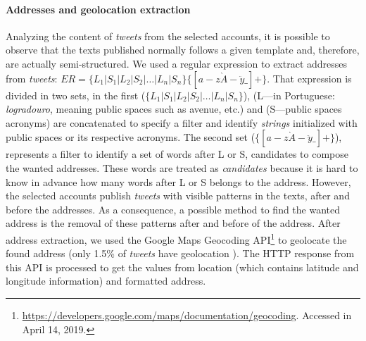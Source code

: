 \documentclass[runningheads]{llncs}
\begin{document}

%

\paragraph{\textbf{Addresses and geolocation extraction}}

Analyzing the content of \textit{tweets} from the selected accounts, it is possible to observe that the texts published normally follows a given template and, therefore, are actually semi-structured. We used a regular expression to extract addresses from \textit{tweets}: $ER = \lbrace L_1 | S_1 | L_2 | S_2 | \dots | L_n | S_n \rbrace \lbrace [a-z\grave{A}-\ddot{y}\_] + \rbrace$.
That expression is divided in two sets, in the first ($\lbrace L_1 | S_1 | L_2 | S_2 | \dots | L_n | S_n \rbrace $), (L---in Portuguese: \textit{logradouro}, meaning public spaces such as avenue, etc.) and (S---public spaces acronyms) are concatenated to specify a filter and identify \textit{strings} initialized with public spaces or its respective acronyms. The second set ($\lbrace [a-z\grave{A}-\ddot{y}\_] + \rbrace $), represents a filter to identify a set of words after L or S, candidates to compose the wanted addresses. These words are treated as \emph{candidates} because it is hard to know in advance how many words after L or S belongs to the address. However, the selected accounts publish \textit{tweets} with visible patterns in the texts, after and before the addresses. As a consequence, a possible method to find the wanted address is the removal of these patterns after and before of the address. After address extraction, we used the Google Maps Geocoding API\footnote{\url{https://developers.google.com/maps/documentation/geocoding}. Accessed in April 14, 2019.} to geolocate the found address (only 1.5\% of \textit{tweets} have geolocation \cite{niu2016community}).
The HTTP response from this API is processed to get the values from location (which contains latitude and longitude information) and formatted address.
\end{document}
